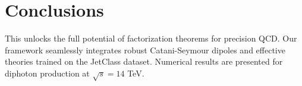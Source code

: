 \section{Conclusions}\label{sec:conclusions}

This unlocks the full potential of factorization theorems for precision
QCD. Our framework seamlessly integrates robust Catani-Seymour dipoles
and effective theories trained on the JetClass dataset. Numerical
results are presented for diphoton production at $\sqrt{s} = 14$ TeV.

